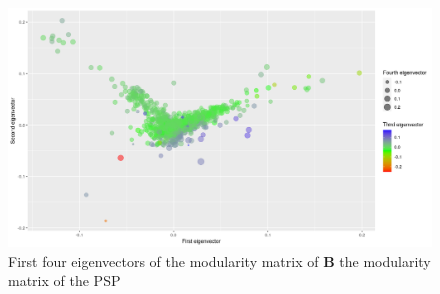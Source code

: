 \begin{figure}
    \centering
    \includegraphics[width=\textwidth]{images/Rplot_eigenvectors_of_PSP_modularity_matrix.png}
    \caption{First four eigenvectors of the modularity matrix of $\mathbf{B}$ the modularity matrix of the PSP}
    \label{fig:first_four_eigenvectors _of_PSP}
\end{figure}
